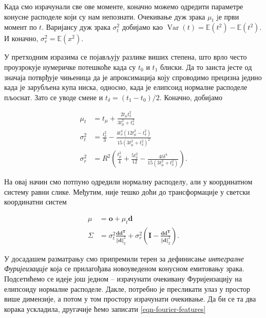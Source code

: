 \documentclass[12pt, a4paper, twoside]{book}
\numberwithin{equation}{chapter}
\numberwithin{theorem}{section}
\numberwithin{definition}{section}
\numberwithin{definitionChapter}{chapter}
\begin{document}
Када смо израчунали све ове моменте, коначно можемо одредити параметре конусне расподеле који су нам непознати.
Очекивање дуж зрака $\mu_t$ jе први момент по $t$. Варијансу дуж зрака $\sigma_t^2$ добијамо
као $\operatorname{Var}(t) = \mathbb{E}(t^2) - \mathbb{E}(t^2)$. И коначно, $\sigma_r^2 = \mathbb{E}(x^2)$.

У претходним изразима се појављују разлике виших степена, што врло често проузрокује нумеричке потешкоће
када су $t_0$ и $t_1$ блиски. Да то заиста јесте од значаја потврђује чињеница да је апроксимација коју
спроводимо прецизна једино када је зарубљена купа ниска, односно, када је елипсоид нормалне расподеле пљоснат.
Зато се уводе смене  и $t_\delta = (t_1 - t_0)/2$. Коначно, добијамо

\begin{equation}
	\begin{split}
		\mu_t & = t_\mu + \frac{2t_\mu t_\delta^2}{3t_\mu^2 + t_\delta^2} \\
		\sigma_t^2 & = \frac{t_\delta^2}{3} - \frac{4t_\delta^4(12t_\mu^2 - t_\delta^2)}{15(3t_\mu^2 + t_\delta^2)^2} \\
		\sigma_r^2 & = R^2 \left(\frac{t_\mu^2}{4} + \frac{5t_\delta^2}{12} - \frac{4t\delta^4}{15(3t_\mu^2 + t_\delta^2)}\right).
	\end{split}
\end{equation}

На овај начин смо потпуно одредили нормалну расподелу, али у координатном систему равни слике. Међутим,
није тешко доћи до трансформације у светски координатни систем

\begin{equation}
	\begin{split}
		\mu & = \mathbf{o} + \mu_t\mathbf{d} \\
		\Sigma & = \sigma_t^2\frac{\mathbf{d}\mathbf{d^T}}{\Vert \mathbf{d}\Vert_2^2} +
			\sigma_r^2\left(\mathbf{I} - \frac{\mathbf{d}\mathbf{d^T}}{\Vert \mathbf{d}\Vert_2^2}\right).
	\end{split}
\end{equation}

У досадашем разматрању смо припремили терен за дефинисање \textit{интегралне Фуријеизације} која се
прилагођава новоуведеном конусном емитовању зрака. Подсетићемо се идеје још једном -- израчунати очекивану
Фуријеизацију на елипсоиду нормалне расподеле. Дакле, потребно је пресликати улаз у простор више димензије,
а потом у том простору израчунати очекивање. Да би се та два корака ускладила, другачије ћемо записати
\ref{eqn-fourier-features}
\end{document}
